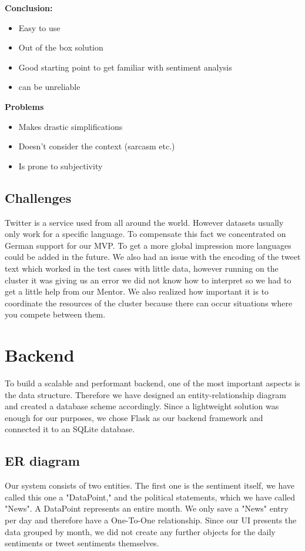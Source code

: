 \documentclass[
    fontsize=12pt,
    headings=small,
    parskip=half,           %
    bibliography=totoc,
    numbers=noenddot,       %
    open=any,               %
    ]{scrreprt}
\begin{document}
\textbf{Conclusion:}

\begin{itemize}
    \item Easy to use
    \item Out of the box solution
    \item Good starting point to get familiar with sentiment analysis
    \item can be unreliable
\end{itemize}

\textbf{Problems}

\begin{itemize}
    \item Makes drastic simplifications
    \item Doesn’t consider the context (sarcasm etc.)
    \item Is prone to subjectivity
\end{itemize}

\subsection{Challenges}
Twitter is a service used from all around the world. However datasets usually only work for a specific language. To compensate this fact we concentrated on German support for our MVP. To get a more global impression more languages could be added in the future. We also had an issue with the encoding of the tweet text which worked in the test cases with little data, however running on the cluster it was giving us an error we did not know how to interpret so we had to get a little help from our Mentor. We also realized how important it is to coordinate the resources of the cluster because there can occur situations where you compete between them. 

\section{Backend}
To build a scalable and performant backend, one of the most important aspects is the data structure. Therefore we have designed an entity-relationship diagram and created a database scheme accordingly. Since a lightweight solution was enough for our purposes, we chose Flask as our backend framework and connected it to an SQLite database.

\subsection{ER diagram}
Our system consists of two entities. The first one is the sentiment itself, we have called this one a "DataPoint," and the political statements, which we have called "News". A DataPoint represents an entire month. We only save a "News" entry per day and therefore have a One-To-One relationship. Since our UI presents the data grouped by month, we did not create any further objects for the daily sentiments or tweet sentiments themselves.
\end{document}
